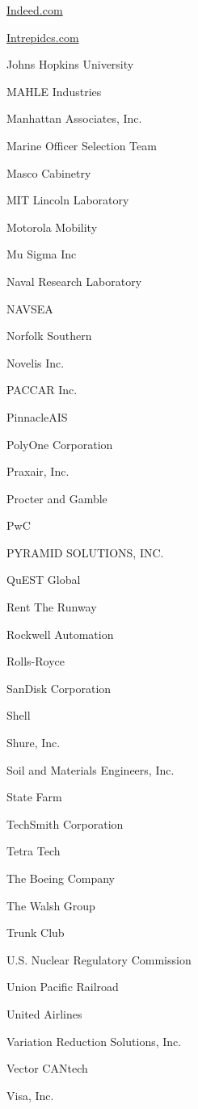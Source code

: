 \documentclass[twoside]{article}
\begin{document}
\begin{center}
\begin{multicols}{5}
\begin{FlushLeft}
\begin{compactitem}
\item \url{Indeed.com}
\item \url{Intrepidcs.com}
\item Johns Hopkins University
\item MAHLE Industries
\item Manhattan Associates, Inc.
\item Marine Officer Selection Team
\item Masco Cabinetry
\item MIT Lincoln Laboratory
\item Motorola Mobility
\item Mu Sigma Inc
\item Naval Research Laboratory
\item NAVSEA
\item Norfolk Southern
\item Novelis Inc.
\item PACCAR Inc.
\item PinnacleAIS
\item PolyOne Corporation
\item Praxair, Inc.
\item Procter and Gamble
\item PwC
\item PYRAMID SOLUTIONS, INC.
\item QuEST Global
\item Rent The Runway
\item Rockwell Automation
\item Rolls-Royce
\item SanDisk Corporation
\item Shell
\item Shure, Inc.
\item Soil and Materials Engineers, Inc.
\item State Farm
\item TechSmith Corporation
\item Tetra Tech
\item The Boeing Company
\item The Walsh Group
\item Trunk Club
\item U.S. Nuclear Regulatory Commission
\item Union Pacific Railroad
\item United Airlines
\item Variation Reduction Solutions, Inc.
\item Vector CANtech
\item Visa, Inc.

\end{compactitem}
\end{FlushLeft}
\end{multicols}
\end{center}
\end{document}
